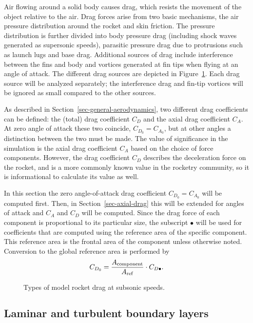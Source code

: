 Air flowing around a solid body causes drag, which resists the
movement of the object relative to the air.  Drag forces arise from
two basic mechanisms, the air pressure distribution around the rocket
and skin friction.  The pressure distribution is further divided into
body pressure drag (including shock waves generated as supersonic
speeds), parasitic pressure drag due to protrusions such as launch
lugs and base drag.  Additional sources of drag include interference
between the fins and body and vortices generated at fin tips when
flying at an angle of attack.  The different drag sources are depicted
in Figure~\ref{fig-drag-components}.  Each drag source will be analyzed
separately; the interference drag and fin-tip vortices will be
ignored as small compared to the other sources.

As described in Section~\ref{sec-general-aerodynamics}, two different
drag coefficients can be defined: the (total) drag coefficient $C_D$
and the axial drag coefficient $C_A$.  At zero angle of attack these
two coincide, $C_{D_0} = C_{A_0}$, but at other angles a distinction
between the two must be made.  The value of significance in the
simulation is the axial drag coefficient $C_A$ based on the choice of
force components.  However, the drag coefficient $C_D$ describes the
deceleration force on the rocket, and is a more commonly known value
in the rocketry community, so it is informational to calculate its
value as well.

In this section the zero angle-of-attack drag coefficient
$C_{D_0} = C_{A_0}$ will be computed first.  Then, in
Section~\ref{sec-axial-drag} this will be extended for angles of
attack and $C_A$ and $C_D$ will be computed.  Since the drag force of
each component is proportional to its particular size, the subscript
$\bullet$ will be used for coefficients that are computed using the
reference area of the specific component.  This reference area is the
frontal area of the component unless otherwise noted.  Conversion to
the global reference area is performed by
%
\begin{equation}
C_{D_0} = \frac{A_{\rm component}}{A_{\rm ref}} \cdot C_{D\bullet}.
\end{equation}


\begin{figure}
\centering
{}
\caption{Types of model rocket drag at subsonic speeds.}
\label{fig-drag-components}
\end{figure}


\subsection{Laminar and turbulent boundary layers}

